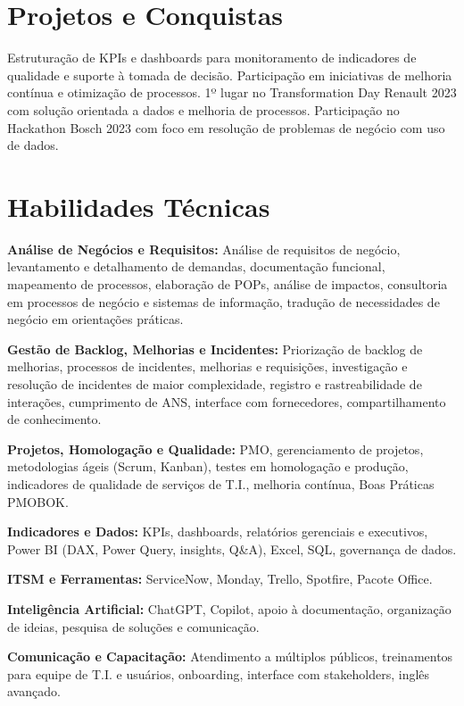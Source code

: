 \documentclass[11pt,a4paper]{article}
\begin{document}
\section*{Projetos e Conquistas}

Estruturação de KPIs e dashboards para monitoramento de indicadores de qualidade e suporte à tomada de decisão. Participação em iniciativas de melhoria contínua e otimização de processos. 1º lugar no Transformation Day Renault 2023 com solução orientada a dados e melhoria de processos. Participação no Hackathon Bosch 2023 com foco em resolução de problemas de negócio com uso de dados.

\section*{Habilidades Técnicas}

\textbf{Análise de Negócios e Requisitos:} Análise de requisitos de negócio, levantamento e detalhamento de demandas, documentação funcional, mapeamento de processos, elaboração de POPs, análise de impactos, consultoria em processos de negócio e sistemas de informação, tradução de necessidades de negócio em orientações práticas.

\textbf{Gestão de Backlog, Melhorias e Incidentes:} Priorização de backlog de melhorias, processos de incidentes, melhorias e requisições, investigação e resolução de incidentes de maior complexidade, registro e rastreabilidade de interações, cumprimento de ANS, interface com fornecedores, compartilhamento de conhecimento.

\textbf{Projetos, Homologação e Qualidade:} PMO, gerenciamento de projetos, metodologias ágeis (Scrum, Kanban), testes em homologação e produção, indicadores de qualidade de serviços de T.I., melhoria contínua, Boas Práticas PMOBOK.

\textbf{Indicadores e Dados:} KPIs, dashboards, relatórios gerenciais e executivos, Power BI (DAX, Power Query, insights, Q\&A), Excel, SQL, governança de dados.

\textbf{ITSM e Ferramentas:} ServiceNow, Monday, Trello, Spotfire, Pacote Office.

\textbf{Inteligência Artificial:} ChatGPT, Copilot, apoio à documentação, organização de ideias, pesquisa de soluções e comunicação.

\textbf{Comunicação e Capacitação:} Atendimento a múltiplos públicos, treinamentos para equipe de T.I. e usuários, onboarding, interface com stakeholders, inglês avançado.
\end{document}
